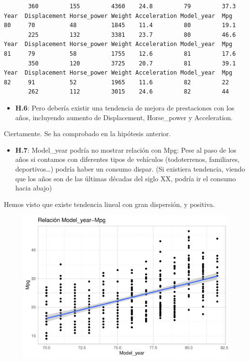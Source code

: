 \begin{verbatim}
       360         155         4360    24.8         79         37.3
Year  Displacement Horse_power Weight Acceleration Model_year  Mpg
80     70          48          1845    11.4         80         19.1
       225         132         3381    23.7         80         46.6
Year  Displacement Horse_power Weight Acceleration Model_year  Mpg
81     79          58          1755    12.6         81         17.6
       350         120         3725    20.7         81         39.1
Year  Displacement Horse_power Weight Acceleration Model_year  Mpg
82     91          52          1965    11.6         82         22
       262         112         3015    24.6         82         44
\end{verbatim}

\begin{itemize}
\item \textbf{H.6}: Pero debería existir una tendencia de mejora de prestaciones con los años, incluyendo aumento de Displacement, Horse\_power y Acceleration.
\end{itemize}

Ciertamente. Se ha comprobado en la hipótesis anterior.

\begin{itemize}
\item \textbf{H.7}: Model\_year podría no mostrar relación con Mpg: Pese al paso de los años si contamos con diferentes tipos de vehículos (todoterrenos, familiares, deportivos\ldots) podría haber un consumo dispar. (Si existiera tendencia, viendo que los años son de las últimas décadas
  del siglo XX, podría ir el consumo hacia abajo)
\end{itemize}

Hemos visto que existe tendencia lineal con gran dispersión, y positiva.

\begin{figure}[H]\includegraphics[width=.9\linewidth]{img/EDA_files/figure-latex/unnamed-chunk-32-1} \caption{}\end{figure}


